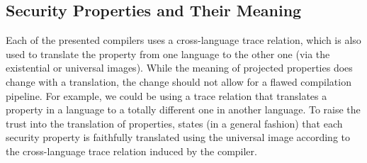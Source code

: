 \documentclass[acmsmall]{acmart}
\theoremstyle{definition}
\begin{document}


\subsection{Security Properties and Their Meaning}\label{subsec:formalities:props}
Each of the presented compilers uses a cross-language trace relation, which is also used to translate the property from one language to the other one (via the existential or universal images).
% 
While the meaning of projected properties does change with a translation, the change should not allow for a flawed compilation pipeline.
% 
For example, we could be using a trace relation that translates a property in a language to a totally different one in another language.
% 
To raise the trust into the translation of properties,  states (in a general fashion) that each security property is faithfully translated using the universal image according to the cross-language trace relation induced by the compiler.
\end{document}

